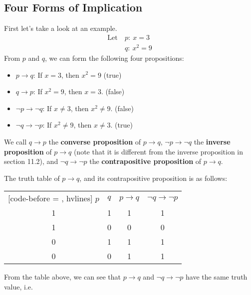 \documentclass{report}
\newcounter{example}
\begin{document}
\subsection*{Four Forms of Implication}

First let's take a look at an example.
\begin{align*}
    \text{Let} & \ p:\ x = 3   \\
               & \ q:\ x^2 = 9
\end{align*}
From $p$ and $q$, we can form the following four propositions:
\begin{itemize}
    \item $p \rightarrow q$: If $x = 3$, then $x^2 = 9$ (true)
    \item $q \rightarrow p$: If $x^2 = 9$, then $x = 3$. (false)
    \item $\neg p \rightarrow \neg q$: If $x \neq 3$, then $x^2 \neq 9$. (false)
    \item $\neg q \rightarrow \neg p$: If $x^2 \neq 9$, then $x \neq 3$. (true)
\end{itemize}

We call $q \rightarrow p$ the \textbf{converse proposition} of $p \rightarrow
    q$, $\neg p \rightarrow \neg q$ the \textbf{inverse proposition} of $p
    \rightarrow q$ (note that it is different from the inverse proposition in
section 11.2), and $\neg q \rightarrow \neg p$ the \textbf{contrapositive
    proposition} of $p \rightarrow q$.

The truth table of $p \rightarrow q$, and its contrapositive proposition is as
follows:
\begin{center}
    \begin{NiceTabular}{|c|c|c|c|}[code-before = , hvlines]
        $p$ & $q$ & $p \rightarrow q$ & $\neg q \rightarrow \neg p$ \\
        1   & 1   & 1                 & 1                           \\
        1   & 0   & 0                 & 0                           \\
        0   & 1   & 1                 & 1                           \\
        0   & 0   & 1                 & 1                           \\
    \end{NiceTabular}
\end{center}

From the table above, we can see that $p \rightarrow q$ and $\neg q \rightarrow
    \neg p$ have the same truth value, i.e.
\end{document}
